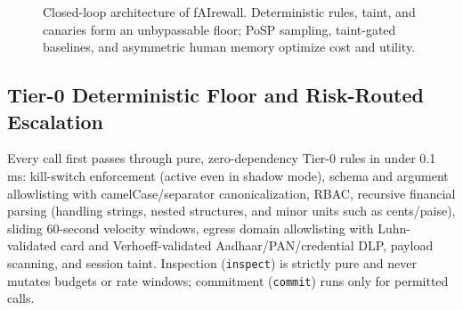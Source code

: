 \documentclass[conference]{IEEEtran}
\begin{document}
\begin{figure}[t]
\centering
{}
\caption{Closed-loop architecture of fAIrewall. Deterministic rules, taint, and canaries form an unbypassable floor; PoSP sampling, taint-gated baselines, and asymmetric human memory optimize cost and utility.}
\label{fig:arch}
\end{figure}

\subsection{Tier-0 Deterministic Floor and Risk-Routed Escalation}
Every call first passes through pure, zero-dependency Tier-0 rules in under 0.1 ms: kill-switch enforcement (active even in shadow mode), schema and argument allowlisting with camelCase/separator canonicalization, RBAC, recursive financial parsing (handling strings, nested structures, and minor units such as cents/paise), sliding 60-second velocity windows, egress domain allowlisting with Luhn-validated card and Verhoeff-validated Aadhaar/PAN/credential DLP, payload scanning, and session taint. Inspection (\texttt{inspect}) is strictly pure and never mutates budgets or rate windows; commitment (\texttt{commit}) runs only for permitted calls.
\end{document}
